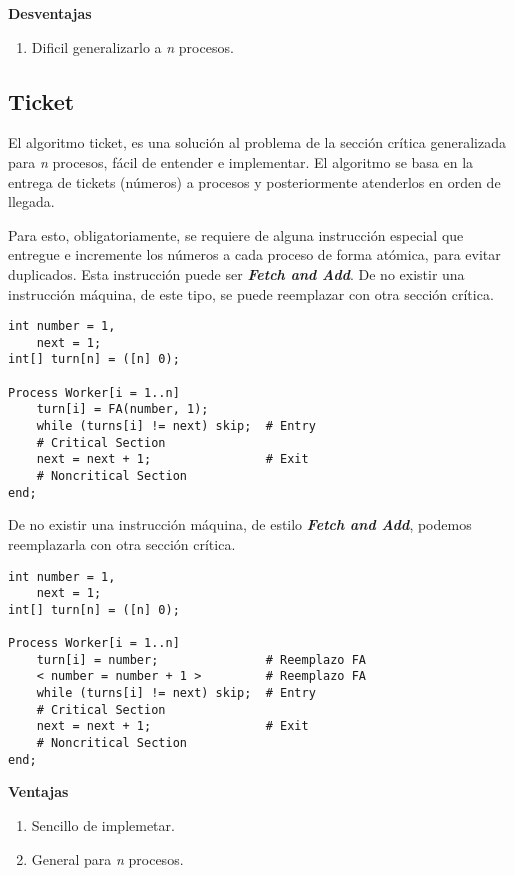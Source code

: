 \documentclass[a4paper, 10pt]{report}
\begin{document}
\textbf{Desventajas}
\begin{enumerate}
    \item Dificil generalizarlo a \emph{n} procesos.
\end{enumerate}

\subsection{Ticket}

El algoritmo ticket, es una solución al problema de la sección crítica generalizada para \emph{n} procesos, fácil de entender e implementar. El algoritmo se basa en la entrega de tickets (números) a procesos y posteriormente atenderlos en orden de llegada.

Para esto, obligatoriamente, se requiere de alguna instrucción especial que entregue e incremente los números a cada proceso de forma atómica, para evitar duplicados. Esta instrucción puede ser \textbf{\emph{Fetch and Add}}. De no existir una instrucción máquina, de este tipo, se puede reemplazar con otra sección crítica.

\begin{lstlisting}
int number = 1,
    next = 1; 
int[] turn[n] = ([n] 0);

Process Worker[i = 1..n]
    turn[i] = FA(number, 1);
    while (turns[i] != next) skip;  # Entry
    # Critical Section
    next = next + 1;                # Exit
    # Noncritical Section
end;
\end{lstlisting}

De no existir una instrucción máquina, de estilo \textbf{\emph{Fetch and Add}}, podemos reemplazarla con otra sección crítica.

\begin{lstlisting}
int number = 1,
    next = 1; 
int[] turn[n] = ([n] 0);

Process Worker[i = 1..n]
    turn[i] = number;               # Reemplazo FA
    < number = number + 1 >         # Reemplazo FA
    while (turns[i] != next) skip;  # Entry
    # Critical Section
    next = next + 1;                # Exit
    # Noncritical Section
end;
\end{lstlisting}

\textbf{Ventajas}
\begin{enumerate}
    \item Sencillo de implemetar.
    \item General para \emph{n} procesos.
\end{enumerate}
\end{document}
